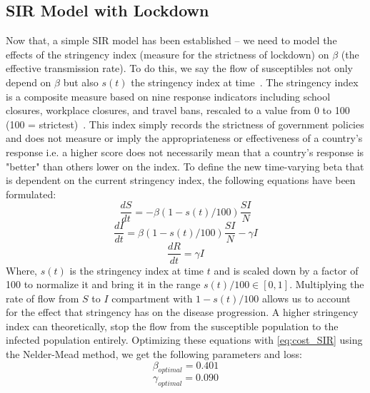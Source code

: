 \documentclass[tikz,fleqn,12pt]{wlscirep}
\begin{document}
\subsection{SIR Model with Lockdown}
Now that, a simple SIR model has been established -- we need to model the effects of the stringency index (measure for the strictness of lockdown) on $\beta$ (the effective transmission rate). To do this, we say the flow of susceptibles not only depend on $\beta$ but also $s(t)$ the stringency index at time~\cite{NBERw26867,AlvarezLockdownSIR,SIRLockdown,SIRLockdown2,analytical_covid_lockdown_model}. The stringency index is a composite measure based on nine response indicators including school closures, workplace closures, and travel bans, rescaled to a value from 0 to 100 (100 = strictest)~\cite{owidcoronavirus}. This index simply records the strictness of government policies and does not measure or imply the appropriateness or effectiveness of a country's response i.e. a higher score does not necessarily mean that a country's response is "better" than others lower on the index. 
To define the new time-varying beta that is dependent on the current stringency index, the following equations have been formulated:
\begin{equation}
  \frac{dS}{dt} = -\beta (1 - s(t)/100) \frac{S I}{N}
  \label{eq:S_with_lockdown}
\end{equation}
\begin{equation}
  \frac{dI}{dt} = \beta (1 - s(t)/100) \frac{S I}{N} - \gamma I
  \label{eq:I_with_lockdown}
\end{equation}
\begin{equation}
  \frac{dR}{dt} = \gamma I
  \label{eq:R_with_lockdown}
\end{equation}
Where, $s(t)$ is the stringency index at time $t$ and is scaled down by a factor of 100 to normalize it and bring it in the range $s(t)/100 \in [0, 1]$. Multiplying the rate of flow from $S$ to $I$ compartment with $1 - s(t)/100$ allows us to account for the effect that stringency has on the disease progression. A higher stringency index can theoretically, stop the flow from the susceptible population to the infected population entirely. Optimizing these equations with \cref{eq:cost_SIR} using the Nelder-Mead method, we get the following parameters and loss:
\begin{equation}
  \beta_{optimal} = 0.401
  \label{eq:beta_optimal_with_lockdown}
\end{equation}
\begin{equation}
  \gamma_{optimal} = 0.090
  \label{eq:gamma_optimal_with_lockdown}
\end{equation}
\end{document}
